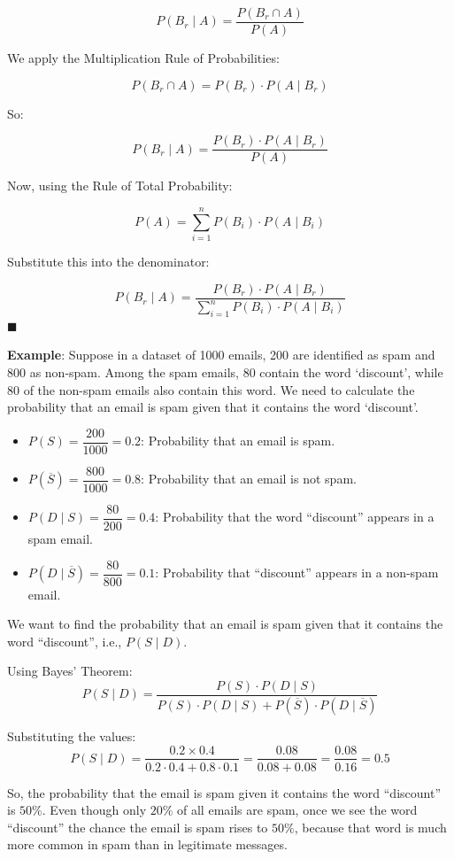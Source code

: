 \documentclass[twoside]{book}
\begin{document}
\[
P(B_r \mid A) = \frac{P(B_r \cap A)}{P(A)}
\]

We apply the Multiplication Rule of Probabilities:

\[
P(B_r \cap A) = P(B_r) \cdot P(A \mid B_r)
\]

So:

\[
P(B_r \mid A) = \frac{P(B_r) \cdot P(A \mid B_r)}{P(A)}
\]

Now, using the Rule of Total Probability:

\[
P(A) = \sum_{i=1}^n P(B_i) \cdot P(A \mid B_i)
\]

Substitute this into the denominator:

\[
P(B_r \mid A) = \frac{P(B_r) \cdot P(A \mid B_r)}{\sum_{i=1}^{n} P(B_i) \cdot P(A \mid B_i)}
\]
\hfill\(\blacksquare\)

\textbf{Example}: Suppose in a dataset of 1000 emails, 200 are identified as spam and 800 as non-spam. Among the spam emails, 80 contain the word `discount', while 80 of the non-spam emails also contain this word. We need to calculate the probability that an email is spam given that it contains the word `discount'.
\begin{itemize}
    \item \( P(S) = \dfrac{200}{1000} = 0.2 \): Probability that an email is spam.
    \item \( P(\overline{S}) = \dfrac{800}{1000} = 0.8 \): Probability that an email is not spam.
    \item \( P(D \mid S) =\dfrac{80}{200} =  0.4 \): Probability that the word ``discount'' appears in a spam email.
    \item \( P(D \mid \overline{S})=\dfrac{80}{800} = 0.1 \): Probability that ``discount'' appears in a non-spam email.
\end{itemize}

We want to find the probability that an email is spam given that it contains the word ``discount'', i.e., \( P(S \mid D) \).

Using Bayes' Theorem:
\[
P(S \mid D) = \frac{P(S) \cdot P(D \mid S)}{P(S) \cdot P(D \mid S) + P(\overline{S}) \cdot P(D \mid \overline{S})}
\]

Substituting the values:
\[
P(S \mid D) = \frac{0.2 \times 0.4}{0.2 \cdot 0.4 + 0.8 \cdot 0.1}
= \frac{0.08}{0.08 + 0.08}
= \frac{0.08}{0.16} = 0.5
\]

So, the probability that the email is spam given it contains the word ``discount'' is \( 50\% \). Even though only \(20\%\) of all emails are spam, once we see the word ``discount'' the chance the email is spam rises to \(50\%\), because that word is much more common in spam than in legitimate messages.
\end{document}
